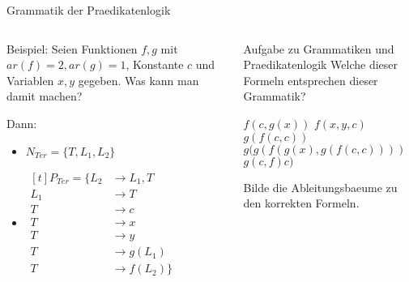 \documentclass[]{beamer}
\begin{document}
\begin{frame}{Grammatik der Praedikatenlogik}
	
	
	\begin{columns}
		\begin{column}{0.6\textwidth}
			Beispiel: Seien Funktionen $f,g$ mit $ar(f) = 2, ar(g) = 1$, Konstante $c$ und Variablen $x,y$ gegeben. Was kann man damit machen?\vspace{.2cm}
			
			\bp
			
			Dann: 
			\begin{itemize}
				\item $N_{Ter}=\{ T, L_1, L_2 \}$
				\item $\begin{aligned}[t]
				P_{Ter} = \{  L_2 & \to L_1 , T \\%
				L_1 & \to T  \\
				T   & \to c \\
				T   & \to x \\
				T   & \to y \\
				T   & \to g ( L_1 ) \\
				T   & \to f ( L_2 ) \}
				\end{aligned}
				$
			\end{itemize}
		\end{column}
		
		\begin{column}{0.4\textwidth}
			\bp
			
			\begin{taskblock}{Aufgabe zu Grammatiken und Praedikatenlogik}
				Welche dieser Formeln entsprechen dieser Grammatik?
				\vspace{.2cm}
				\begin{itemize}
					\pitem $f(c, g(x))$
					\pitem $f(x, y, c)$
					\pitem $g(f(c, c))$
					\pitem $g(g(f(g(x), g(f(c, c))))$
					\pitem $g(c, f)c)$
				\end{itemize}
			
				\ip Bilde die Ableitungsbaeume zu den korrekten Formeln.
			\end{taskblock}
		\end{column}
	\end{columns}
\end{frame}
\end{document}
